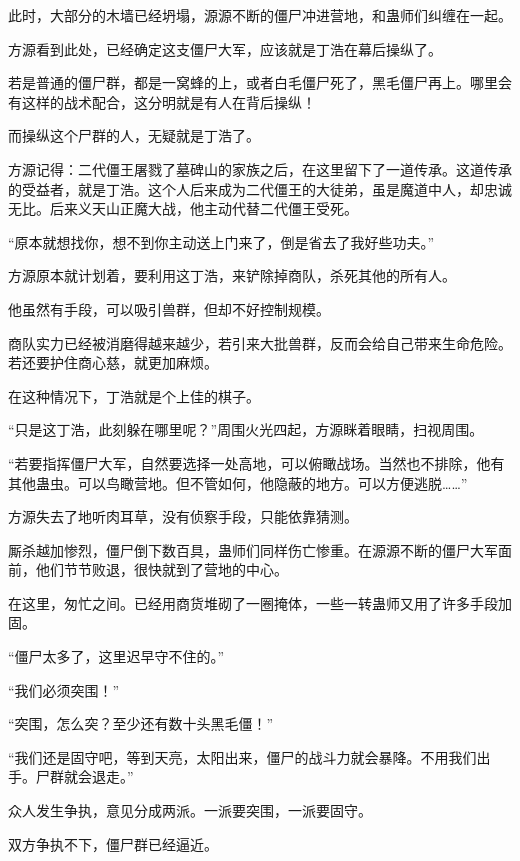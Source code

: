 
\begin{this_body}

此时，大部分的木墙已经坍塌，源源不断的僵尸冲进营地，和蛊师们纠缠在一起。

方源看到此处，已经确定这支僵尸大军，应该就是丁浩在幕后操纵了。

若是普通的僵尸群，都是一窝蜂的上，或者白毛僵尸死了，黑毛僵尸再上。哪里会有这样的战术配合，这分明就是有人在背后操纵！

而操纵这个尸群的人，无疑就是丁浩了。

方源记得：二代僵王屠戮了墓碑山的家族之后，在这里留下了一道传承。这道传承的受益者，就是丁浩。这个人后来成为二代僵王的大徒弟，虽是魔道中人，却忠诚无比。后来义天山正魔大战，他主动代替二代僵王受死。

“原本就想找你，想不到你主动送上门来了，倒是省去了我好些功夫。”

方源原本就计划着，要利用这丁浩，来铲除掉商队，杀死其他的所有人。

他虽然有手段，可以吸引兽群，但却不好控制规模。

商队实力已经被消磨得越来越少，若引来大批兽群，反而会给自己带来生命危险。若还要护住商心慈，就更加麻烦。

在这种情况下，丁浩就是个上佳的棋子。

“只是这丁浩，此刻躲在哪里呢？”周围火光四起，方源眯着眼睛，扫视周围。

“若要指挥僵尸大军，自然要选择一处高地，可以俯瞰战场。当然也不排除，他有其他蛊虫。可以鸟瞰营地。但不管如何，他隐蔽的地方。可以方便逃脱……”

方源失去了地听肉耳草，没有侦察手段，只能依靠猜测。

厮杀越加惨烈，僵尸倒下数百具，蛊师们同样伤亡惨重。在源源不断的僵尸大军面前，他们节节败退，很快就到了营地的中心。

在这里，匆忙之间。已经用商货堆砌了一圈掩体，一些一转蛊师又用了许多手段加固。

“僵尸太多了，这里迟早守不住的。”

“我们必须突围！”

“突围，怎么突？至少还有数十头黑毛僵！”

“我们还是固守吧，等到天亮，太阳出来，僵尸的战斗力就会暴降。不用我们出手。尸群就会退走。”

众人发生争执，意见分成两派。一派要突围，一派要固守。

双方争执不下，僵尸群已经逼近。


\end{this_body}
